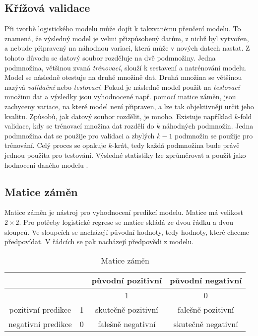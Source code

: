 \subsection{Křížová validace}
Při tvorbě logistického modelu může dojít k takzvanému přeučení modelu. To znamená, že výsledný model je velmi přizpůsobený datům, z nichž byl vytvořen, a nebude
připravený na náhodnou variaci, která může v nových datech nastat. Z tohoto důvodu se datový soubor rozděluje na dvě podmnožiny. Jedna podmnožina, většinou zvaná
\textit{trénovací},
slouží k sestavení a natrénování modelu. Model se 
následně otestuje na druhé množině dat. Druhá množina se většinou nazývá \textit{validační} nebo \textit{testovací}. 
Pokud je následně model použit na \textit{testovací} množinu dat a výsledky jsou vyhodnocené např. pomocí matice záměn, jsou zachyceny variace,
na které model není připraven, a lze tak objektivněji určit jeho kvalitu. Způsobů, jak datový soubor
rozdělit, je mnoho. Existuje například $k$-fold validace, kdy se trénovací množina dat rozdělí do $k$ 
náhodných podmnožin. Jedna podmnožina dat se použije pro validaci a zbylých $k-1$ podmnožin se použije pro trénování.
Celý proces se opakuje $k$-krát, tedy každá podmnožina bude právě jednou použita pro testování. Výsledné statistiky lze zprůměrovat a použít jako hodnocení
daného modelu \cite{hill_statistics_2006}.

\subsection{Matice záměn}
Matice záměn je nástroj pro vyhodnocení predikcí modelu. Matice má velikost $2 \times 2$. Pro potřeby logistické regrese se matice skládá ze dvou řádku a dvou sloupců.
Ve sloupcích se nacházejí původní hodnoty, tedy hodnoty, které chceme předpovídat. V řádcích se pak nacházejí předpovědi z modelu.  

\begin{table}[H]
    \centering
    \begin{tabular}{|c|c|c|c|}
        \hline
                           &   & původní pozitivní   & původní negativní    \\ \hline
                           &   & 1                  & 0                  \\ \hline
        pozitivní predikce & 1 & skutečně pozitivní & falešně pozitivní  \\ \hline
        negativní predikce & 0 & falešně negativní  & skutečně negativní \\ \hline
    \end{tabular}
    \caption{\label{tab:matice_zamen}Matice záměn}
\end{table}

